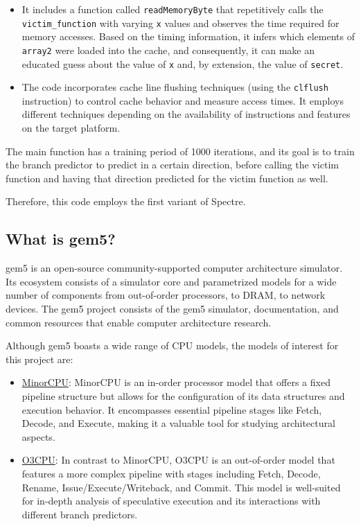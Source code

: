 \documentclass[twocolumn,showpacs,%
  nofootinbib,aps,superscriptaddress,%
  eqsecnum,prd,notitlepage,showkeys,10pt]{revtex4-1}
\begin{document}
\begin{itemize}
  \item It includes a function called \texttt{readMemoryByte} that repetitively calls the \texttt{victim\_function} with varying \texttt{x} values and observes the time required for memory accesses. Based on the timing information, it infers which elements of \texttt{array2} were loaded into the cache, and consequently, it can make an educated guess about the value of \texttt{x} and, by extension, the value of \texttt{secret}.
  
  \item The code incorporates cache line flushing techniques (using the \texttt{clflush} instruction) to control cache behavior and measure access times. It employs different techniques depending on the availability of instructions and features on the target platform.
\end{itemize}

The main function has a training period of 1000 iterations, and its goal is to train the branch predictor to predict in a certain direction, before calling the victim function and having that direction predicted for the victim function as well.

Therefore, this code employs the first variant of Spectre.

\subsection{What is gem5?}

gem5 is an open-source community-supported computer architecture simulator. Its ecosystem consists of a simulator core and parametrized models for a wide number of components from out-of-order processors, to DRAM, to network devices. The gem5 project consists of the gem5 simulator, documentation, and common resources that enable computer architecture research. \cite{lowepower2020gem5}


Although gem5 boasts a wide range of CPU models, the models of interest for this project are:

\begin{itemize}
    \item \underline{MinorCPU}: MinorCPU is an in-order processor model that offers a fixed pipeline structure but allows for the configuration of its data structures and execution behavior. It encompasses essential pipeline stages like Fetch, Decode, and Execute, making it a valuable tool for studying architectural aspects.\cite{butko2015design}
    \item \underline{O3CPU}: In contrast to MinorCPU, O3CPU is an out-of-order model that features a more complex pipeline with stages including Fetch, Decode, Rename, Issue/Execute/Writeback, and Commit. This model is well-suited for in-depth analysis of speculative execution and its interactions with different branch predictors.\cite{butko2015design}
\end{itemize}
\end{document}
